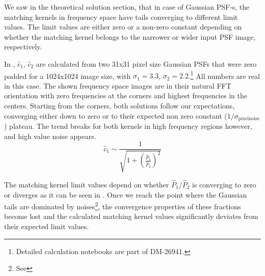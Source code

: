 \documentclass[11pt]{article}
\begin{document}
%
\par We saw in the theoretical solution section, that in case of
Gaussian PSF-s, the matching kernels in frequency space have tails
converging to different limit values. The limit values are either zero
or a non-zero constant depending on whether the matching kernel belongs
to the narrower or wider input PSF image, respectively.
%
\par In , \(\hat{c}_1\),
\(\hat{c}_2\) are calculated from two 31x31 pixel size Gaussian PSFs that
were zero padded for a 1024x1024 image size, with \(\sigma_1=3.3\),
\(\sigma_2=2.2\).\footnote{Detailed calculation notebooks are part of
  DM-26941.} All numbers are real in this case. The shown frequency
space images are in their natural FFT orientation with zero frequencies at
the corners and highest frequencies in the centers. Starting from the
corners, both solutions follow our expectations, converging either down to
zero or to their expected non zero constant (\(1/\sigma_\mathrm{pixel
  noise}\)) plateau. The trend breaks for both kernels in high frequency
regions however, and high value noise appears.
\begin{equation}
\hat{c}_1 \sim \frac{1}{\sqrt{1 + \left(\frac{\hat{P}_1}{\hat{P}_2}\right)^2}}
\label{eq:c1conv}
\end{equation}
\par The matching kernel limit values depend on whether
\(\hat{P}_1/\hat{P}_2\) is converging to zero or diverges as it can be seen
in . Once we reach the point where the Gaussian tails are
dominated by noises\footnote{See }, the convergence
properties of these fractions become lost and the calculated matching kernel
values significantly deviates from their expected limit values.
%
\end{document}
